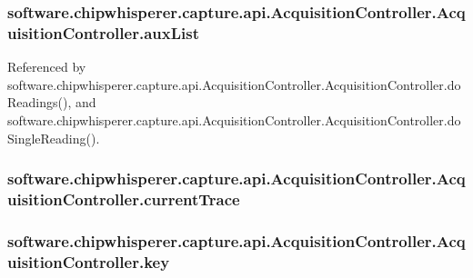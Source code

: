 \subsubsection[{aux\+List}]{\setlength{\rightskip}{0pt plus 5cm}software.\+chipwhisperer.\+capture.\+api.\+Acquisition\+Controller.\+Acquisition\+Controller.\+aux\+List}\label{classsoftware_1_1chipwhisperer_1_1capture_1_1api_1_1AcquisitionController_1_1AcquisitionController_af2a82339b3c109784651a892ad11af0e}


Referenced by software.\+chipwhisperer.\+capture.\+api.\+Acquisition\+Controller.\+Acquisition\+Controller.\+do\+Readings(), and software.\+chipwhisperer.\+capture.\+api.\+Acquisition\+Controller.\+Acquisition\+Controller.\+do\+Single\+Reading().

\hypertarget{classsoftware_1_1chipwhisperer_1_1capture_1_1api_1_1AcquisitionController_1_1AcquisitionController_ad5973cf8c9b8dc18b2f6b035588cf200}{}
\subsubsection[{current\+Trace}]{\setlength{\rightskip}{0pt plus 5cm}software.\+chipwhisperer.\+capture.\+api.\+Acquisition\+Controller.\+Acquisition\+Controller.\+current\+Trace}\label{classsoftware_1_1chipwhisperer_1_1capture_1_1api_1_1AcquisitionController_1_1AcquisitionController_ad5973cf8c9b8dc18b2f6b035588cf200}
\hypertarget{classsoftware_1_1chipwhisperer_1_1capture_1_1api_1_1AcquisitionController_1_1AcquisitionController_a36814776cc9ac9faaf5e521b75bfc197}{}
\subsubsection[{key}]{\setlength{\rightskip}{0pt plus 5cm}software.\+chipwhisperer.\+capture.\+api.\+Acquisition\+Controller.\+Acquisition\+Controller.\+key}\label{classsoftware_1_1chipwhisperer_1_1capture_1_1api_1_1AcquisitionController_1_1AcquisitionController_a36814776cc9ac9faaf5e521b75bfc197}


